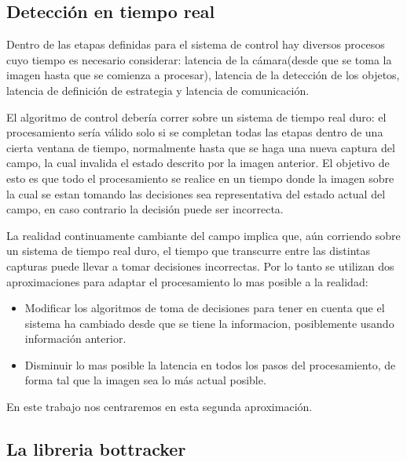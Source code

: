 \documentclass[a4paper,10pt]{report}
\begin{document}
\subsection{Detección en tiempo real}
Dentro de las etapas definidas para el sistema de control hay diversos procesos cuyo tiempo es necesario considerar: latencia de la cámara(desde que se toma la imagen hasta que se comienza a procesar),
latencia de la detección de los objetos, latencia de definición de estrategia y latencia de comunicación.


El algoritmo de control debería correr sobre un sistema de tiempo real duro: el procesamiento sería válido solo si se completan todas las etapas dentro de una cierta ventana de tiempo, normalmente hasta que se haga una nueva captura del campo, la cual invalida el estado descrito por la imagen anterior.
El objetivo de esto es que todo el procesamiento se realice en un tiempo donde la imagen sobre la cual se estan tomando las decisiones sea representativa del estado actual del campo, en caso contrario la decisión puede ser incorrecta.

La realidad continuamente cambiante del campo implica que, aún corriendo sobre un sistema de tiempo real duro, el tiempo que transcurre entre las distintas capturas puede llevar a tomar decisiones incorrectas.
Por lo tanto se utilizan dos aproximaciones para adaptar el procesamiento lo mas posible a la realidad: 
\begin{itemize}
 \item Modificar los algoritmos de toma de decisiones para tener en cuenta que el sistema ha cambiado desde que se tiene la informacion, posiblemente usando información anterior.
 \item Disminuir lo mas posible la latencia en todos los pasos del procesamiento, de forma tal que la imagen sea lo más actual posible.
\end{itemize}

En este trabajo nos centraremos en esta segunda aproximación.






\subsection{La libreria bottracker}
\end{document}
